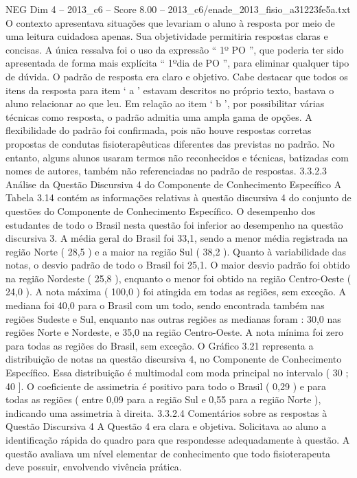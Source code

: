 \begin{textsample}{NEG Dim 4 – 2013\_c6 – Score 8.00 – 2013\_c6/enade\_2013\_fisio\_a31223fe5a.txt}
O contexto apresentava situações que levariam o aluno à resposta por meio de uma leitura cuidadosa apenas.
Sua objetividade permitiria respostas claras e concisas.
A única ressalva foi o uso da expressão “ 1º PO ”, que poderia ter sido apresentada de forma mais explícita “ 1ºdia de PO ”, para eliminar qualquer tipo de dúvida.
O padrão de resposta era claro e objetivo.
Cabe destacar que todos os itens da resposta para item ‘ a ’ estavam descritos no próprio texto, bastava o aluno relacionar ao que leu.
Em relação ao item ‘ b ’, por possibilitar várias técnicas como resposta, o padrão admitia uma ampla gama de opções.
A flexibilidade do padrão foi confirmada, pois não houve respostas corretas propostas de condutas fisioterapêuticas diferentes das previstas no padrão.
No entanto, alguns alunos usaram termos não reconhecidos e técnicas, batizadas com nomes de autores, também não referenciadas no padrão de respostas. 3.3.2.3 Análise da Questão Discursiva 4 do Componente de Conhecimento Específico A Tabela 3.14 contém as informações relativas à questão discursiva 4 do conjunto de questões do Componente de Conhecimento Específico.
O desempenho dos estudantes de todo o Brasil nesta questão foi inferior ao desempenho na questão discursiva 3.
A média geral do Brasil foi 33,1, sendo a menor média registrada na região Norte ( 28,5 ) e a maior na região Sul ( 38,2 ).
Quanto à variabilidade das notas, o desvio padrão de todo o Brasil foi 25,1.
O maior desvio padrão foi obtido na região Nordeste ( 25,8 ), enquanto o menor foi obtido na região Centro-Oeste ( 24,0 ).
A nota máxima ( 100,0 ) foi atingida em todas as regiões, sem exceção.
A mediana foi 40,0 para o Brasil com um todo, sendo encontrada também nas regiões Sudeste e Sul, enquanto nas outras regiões as medianas foram : 30,0 nas regiões Norte e Nordeste, e 35,0 na região Centro-Oeste.
A nota mínima foi zero para todas as regiões do Brasil, sem exceção.
O Gráfico 3.21 representa a distribuição de notas na questão discursiva 4, no Componente de Conhecimento Específico.
Essa distribuição é multimodal com moda principal no intervalo ( 30 ; 40 ].
O coeficiente de assimetria é positivo para todo o Brasil ( 0,29 ) e para todas as regiões ( entre 0,09 para a região Sul e 0,55 para a região Norte ), indicando uma assimetria à direita. 3.3.2.4 Comentários sobre as respostas à Questão Discursiva 4 A Questão 4 era clara e objetiva.
Solicitava ao aluno a identificação rápida do quadro para que respondesse adequadamente à questão.
A questão avaliava um nível elementar de conhecimento que todo fisioterapeuta deve possuir, envolvendo vivência prática.

\end{textsample}
